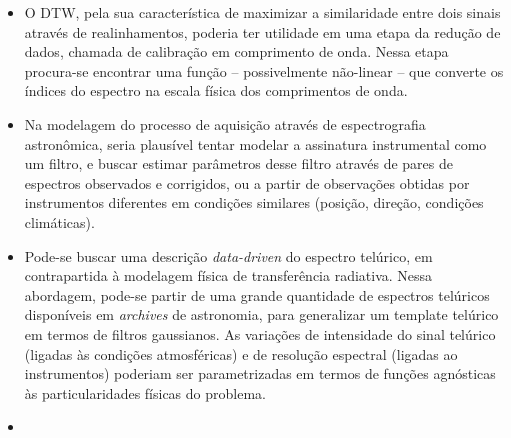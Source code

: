 \begin{itemize}



\item O DTW, pela sua característica de maximizar a similaridade entre dois sinais através de realinhamentos, poderia ter utilidade em uma etapa da redução de dados, chamada de calibração em comprimento de onda. Nessa etapa procura-se encontrar uma função -- possivelmente não-linear -- que converte os índices do espectro na escala física dos comprimentos de onda. 

\item Na modelagem do processo de aquisição através de espectrografia astronômica, seria plausível tentar modelar a assinatura instrumental como um filtro, e buscar estimar parâmetros desse filtro através de pares de espectros observados e corrigidos, ou a partir de observações obtidas por instrumentos diferentes em condições similares (posição, direção, condições climáticas).%

\item Pode-se buscar uma descrição \textit{data-driven} do espectro telúrico, em contrapartida à modelagem física de transferência radiativa. Nessa abordagem, pode-se partir de uma grande quantidade de espectros telúricos disponíveis em \textit{archives} de astronomia, para generalizar um template telúrico em termos de filtros gaussianos. As variações de intensidade do sinal telúrico (ligadas às condições atmosféricas) e de resolução espectral (ligadas ao instrumentos) poderiam ser parametrizadas em termos de funções agnósticas às particularidades físicas do problema.

\item {}


\end{itemize}
